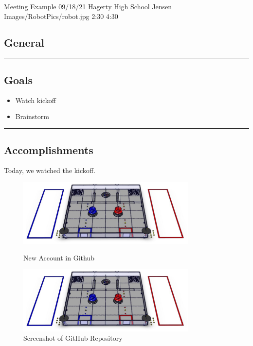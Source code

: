 \insertmeeting 
	{Meeting Example} 
	{09/18/21}
	{Hagerty High School}
	{Jensen}
	{Images/RobotPics/robot.jpg}
	{2:30}
  {4:30}
	
\subsection*{General}
\noindent\hfil\rule{\textwidth}{.4pt}\hfil
\subsection*{Goals}
\begin{itemize}
    \item Watch kickoff
    \item Brainstorm   

\end{itemize} 

\noindent\hfil\rule{\textwidth}{.4pt}\hfil

\subsection*{Accomplishments}
Today, we watched the kickoff.
 

\begin{figure}[ht]
\centering
\begin{minipage}[b]{.50\textwidth}
  \centering
  \includegraphics[width=0.8\textwidth]{Meetings/September/09-18-21/field.png}
  \caption{New Account in Github}
  \label{fig:pic1}
\end{minipage}%
\hfill%
\begin{minipage}[b]{.50\textwidth}
  \centering
  \includegraphics[width=0.8\textwidth]{Meetings/September/09-18-21/field.png}
  \caption{Screenshot of GitHub Repository}
  \label{fig:pic2}
\end{minipage}
\end{figure}

